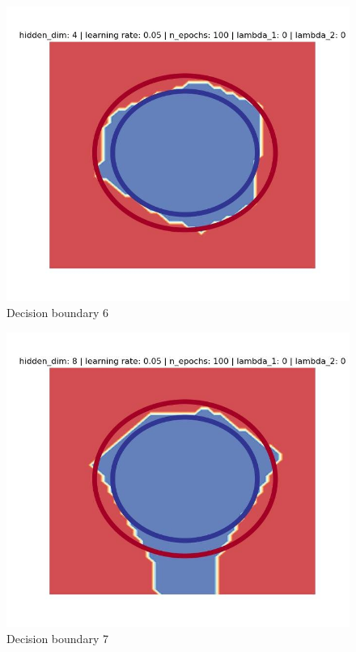\documentclass[11pt,english]{article}
\begin{document}
\begin{figure}
	\includegraphics[width=\linewidth]{decision6.jpg}
	\caption{Decision boundary 6}
	\label{fig:boat1}
\end{figure}

\begin{figure}
	\includegraphics[width=\linewidth]{decision7.jpg}
	\caption{Decision boundary 7}
	\label{fig:boat1}
\end{figure}
\end{document}
